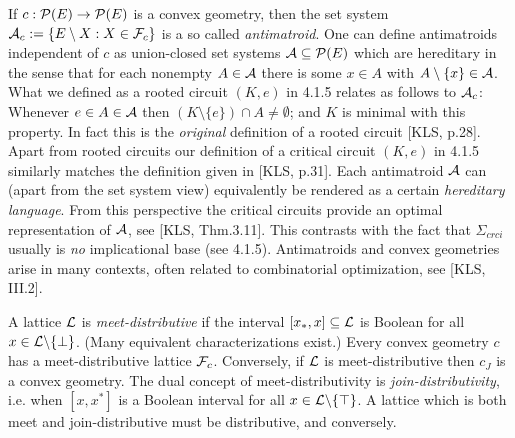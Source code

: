 \documentclass[11pt]{article}
\newcommand{\ra}{\rightarrow}
\begin{document}
  If $c: {\cal P}(E) \ra {\cal P}(E)$ is a convex geometry, then the set system ${\cal A}_c : = \{E \setminus X: X \in {\cal F}_c\}$ is a so called {\it antimatroid}. One can define antimatroids independent of $c$ as union-closed set systems ${\cal A} \subseteq {\cal P}(E)$ which are hereditary in the sense that for each nonempty $A \in {\cal A}$ there is some $x \in A$ with $A \setminus \{x\} \in {\cal A}$. What we defined as a rooted circuit $(K, e)$ in 4.1.5 relates as follows to ${\cal A}_c$: Whenever $e \in A \in {\cal A}$ then $(K \setminus \{e\}) \cap A \neq \emptyset$; and $K$ is minimal with this property. In fact this is the {\it original} definition of a rooted circuit [KLS, p.28]. Apart from rooted circuits our definition of a critical circuit $(K, e)$ in 4.1.5 similarly matches the definition given in [KLS, p.31]. Each antimatroid ${\cal A}$ can (apart from the set system view) equivalently be rendered as a certain {\it hereditary language}. From this perspective the critical circuits provide an optimal representation of ${\cal A}$, see [KLS, Thm.3.11]. This contrasts with the fact that $\Sigma_{crci}$ usually is {\it no} implicational base (see 4.1.5). Antimatroids and convex geometries arise in many contexts, often related to combinatorial optimization, see [KLS, III.2].
  

A lattice ${\cal L}$ is {\it meet-distributive} if the interval $[x_\ast, x] \subseteq {\cal L}$ is Boolean for all $x \in {\cal L} \backslash \{\bot\}$. (Many equivalent characterizations exist.) Every convex geometry $c$ has a meet-distributive lattice ${\cal F}_c$. Conversely, if ${\cal L}$ is meet-distributive then $c_J$ is a convex geometry. 
 The dual concept of meet-distributivity is {\it join-distributivity}, i.e. when 
$[x,x^\ast]$ is a Boolean interval for all $x \in {\cal L} \backslash \{\top\}$.  A lattice which is both meet and join-distributive must be distributive, and conversely.



 
 
\end{document}
